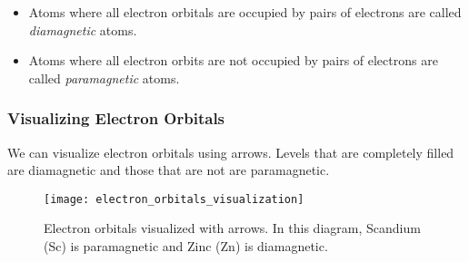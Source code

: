 \begin{itemize}
\item Atoms where all electron orbitals are occupied by pairs of electrons are called \textit{diamagnetic} atoms.
\item Atoms where all electron orbits are not occupied by pairs of electrons are called \textit{paramagnetic} atoms.
\end{itemize}

\subsubsection{Visualizing Electron Orbitals}

We can visualize electron orbitals using arrows. Levels that are completely filled are diamagnetic and those that are not are paramagnetic.

\begin{figure}[H]
	\centering
	\texttt{[image: electron\_orbitals\_visualization]}
	\caption{Electron orbitals visualized with arrows. In this diagram, Scandium (Sc) is paramagnetic and Zinc (Zn) is diamagnetic.}
\end{figure}

